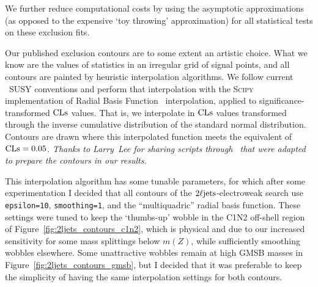 We further reduce computational costs by using the asymptotic approximations
(as opposed to the expensive `toy throwing' approximation) for all statistical
tests on these exclusion fits.

Our published exclusion contours are to some extent an artistic choice.
What we know are the values of statistics in an irregular grid of
signal points,
and all contours are painted by heuristic interpolation algorithms.
We follow current \atlas\ SUSY conventions and perform that interpolation
with the \textsc{Scipy} implementation of
Radial Basis Function~\cite{2020SciPy-NMeth,fasshauer2007meshfree}
interpolation, applied to significance-transformed $\mathrm{CLs}$ values.
That is, we interpolate in $\mathrm{CLs}$ values transformed through the inverse
cumulative distribution of the standard normal distribution.
Contours are drawn where this interpolated function meets the equivalent of
$\mathrm{CLs} = 0.05$.
\emph{%
Thanks to Larry~Lee for sharing scripts through \histfitter\ that were adapted
to prepare the contours in our results.%
}

This interpolation algorithm has some tunable parameters, for which after some
experimentation I decided that all contours of the $2\ell\mathrm{jets}$-electroweak
search use
\texttt{epsilon=10},
\texttt{smoothing=1},
and the ``multiquadric'' radial basis function.
These settings were tuned to keep the `thumbs-up' wobble in the C1N2 off-shell
region of Figure~\ref{fig:2ljets_contours_c1n2},
which is physical and due to our increased sensitivity for some mass splittings
below $m(Z)$,
while sufficiently smoothing wobbles elsewhere.
Some unattractive wobbles remain at high GMSB masses in
Figure~\ref{fig:2ljets_contours_gmsb}, but I decided that it was preferable to
keep the simplicity of having the same interpolation settings for both
contours.


